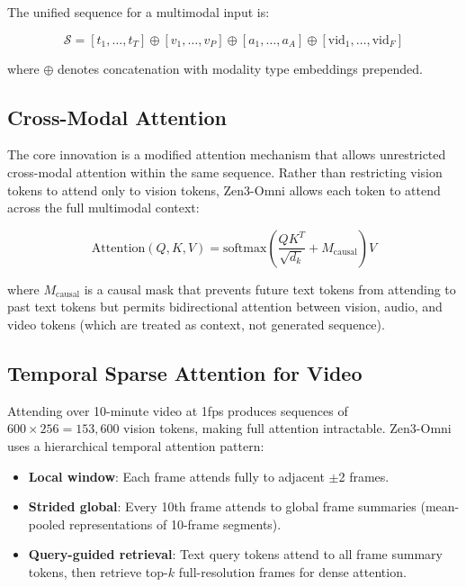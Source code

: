 \documentclass[11pt,a4paper]{article}
\begin{document}
The unified sequence for a multimodal input is:

\begin{equation}
\mathcal{S} = [t_1, \ldots, t_T] \oplus [v_1, \ldots, v_P] \oplus [a_1, \ldots, a_A] \oplus [\text{vid}_1, \ldots, \text{vid}_F]
\end{equation}

where $\oplus$ denotes concatenation with modality type embeddings prepended.

\subsection{Cross-Modal Attention}

The core innovation is a modified attention mechanism that allows unrestricted
cross-modal attention within the same sequence. Rather than restricting vision
tokens to attend only to vision tokens, Zen3-Omni allows each token to attend
across the full multimodal context:

\begin{equation}
\text{Attention}(Q, K, V) = \text{softmax}\!\left(\frac{QK^T}{\sqrt{d_k}} + M_{\text{causal}}\right) V
\end{equation}

where $M_{\text{causal}}$ is a causal mask that prevents future text tokens from
attending to past text tokens but permits bidirectional attention between vision,
audio, and video tokens (which are treated as context, not generated sequence).

\subsection{Temporal Sparse Attention for Video}

Attending over 10-minute video at 1fps produces sequences of $600 \times 256 = 153{,}600$
vision tokens, making full attention intractable. Zen3-Omni uses a hierarchical
temporal attention pattern:

\begin{itemize}
\item \textbf{Local window}: Each frame attends fully to adjacent $\pm$2 frames.
\item \textbf{Strided global}: Every 10th frame attends to global frame summaries
      (mean-pooled representations of 10-frame segments).
\item \textbf{Query-guided retrieval}: Text query tokens attend to all frame summary
      tokens, then retrieve top-$k$ full-resolution frames for dense attention.
\end{itemize}
\end{document}
